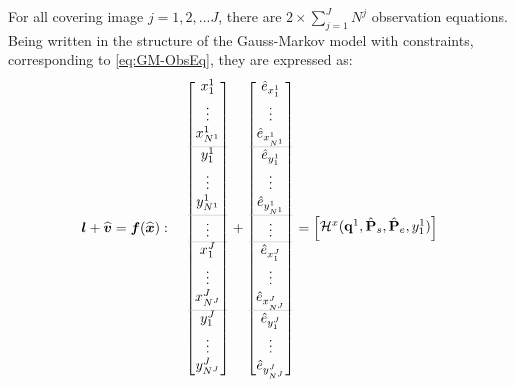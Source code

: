 For all covering image $j=1,2,...J$, there are $2\times\displaystyle\sum_{j=1}^{J}N^j$ observation equations. Being written in the structure of the Gauss-Markov model with constraints, corresponding to \cref{eq:GM-ObsEq}, they are expressed as:
\begin{equation} \label{eq:obsvec-allcam}
\boldsymbol l+\widehat{\boldsymbol v}=\boldsymbol f(\widehat{\boldsymbol x}):\quad
\begin{bmatrix}
 x^1_1\\[0.3em]
 \vdots\\
 x^1_{N^1}\\[0.3em]
 \arrayrulecolor{lightgray} \hline
 y^1_1\\[0.3em]
 \vdots\\
 y^1_{N^1}\\[0.3em]
 \arrayrulecolor{lightgray} \hline
 \vdots\\
 \arrayrulecolor{lightgray} \hline
 x^J_1\\[0.3em]
 \vdots\\
 x^J_{N^J}\\[0.3em]
 \arrayrulecolor{lightgray} \hline
 y^J_1\\[0.3em]
 \vdots\\
 y^J_{N^J}\\[0.3em]
\end{bmatrix}
+
\begin{bmatrix}
 \hat{e}_{x^1_1}\\[0.3em]
 \vdots\\
 \hat{e}_{x^1_{N^1}}\\[0.3em]
 \arrayrulecolor{lightgray} \hline
 \hat{e}_{y^1_1}\\[0.3em]
 \vdots\\
 \hat{e}_{y^1_{N^1}}\\[0.3em]
 \arrayrulecolor{lightgray} \hline
 \vdots\\
 \arrayrulecolor{lightgray} \hline
 \hat{e}_{x^J_1}\\[0.3em]
 \vdots\\
 \hat{e}_{x^J_{N^J}}\\[0.3em]
 \arrayrulecolor{lightgray} \hline
 \hat{e}_{y^J_1}\\[0.3em]
 \vdots\\
 \hat{e}_{y^J_{N^J}}\\[0.3em]
\end{bmatrix}
=
\begin{bmatrix}
 \mathcal{H}^x(\mathbf{q}^1,\hat{\mathbf{P}}_s,\hat{\mathbf{P}}_e,y^1_1)\\[0.3em]

\end{bmatrix}
\end{equation}
